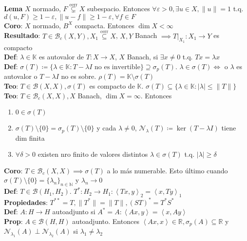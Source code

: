 \documentclass[9pt]{extarticle}
\newcommand{\N}{\mathbb{N}}
\newcommand{\R}{\mathbb{R}}
\newcommand{\K}{\mathbb{K}}
\newcommand{\inn}[1]{\left\langle #1\right\rangle}
\begin{document}
\begin{multicols*}{2}
\begin{enumerate}
\end{enumerate}
\textbf{Lema} $X$ normado, $F\overset{\text{cerr}}{\subsetneq} X$ subespacio. Entonces $\forall \varepsilon>0,\exists u\in X,\|u\|=1$ t.q. $d(u,F)\geq 1-\varepsilon, \|u-f\|\geq 1-\varepsilon,\forall f\in F$\\
\textbf{Coro}: $X$ normado, $B^X$ compacta. Entonces $\operatorname{dim}X<\infty$\\
\textbf{Resultado}: $T\in\mathcal{B}_c(X,Y), X_1\overset{\text{cerr}}{\subseteq}X$, $X,Y$ Banach $\implies T\big|_{X_1}:X_1\to Y$ es compacto\\
\textbf{Def}: $\lambda\in\K$ es autovalor de $T:X\to X$, $X$ Banach, si $\exists x\neq 0$ t.q. $Tx=\lambda x$\\
\textbf{Def}: $\sigma(T)\coloneqq \{\lambda\in\K:T-\lambda I\text{ no es invertible}\}\supseteq \sigma_p(T)$. $\lambda\in \sigma(T)\iff$ o $\lambda$ es autovalor o $T-\lambda I$ no es sobre. $\rho(T)=\K\setminus \sigma(T)$\\
\textbf{Teo}: $T\in\mathcal{B}(X,X), \sigma(T)$ es compacto de $\K$. $\sigma(T)\subseteq \{\lambda\in\K:|\lambda|\leq \|T\|\}$\\
\textbf{Teo}: $T\in\mathcal{B}_c(X,X), X$ Banach, $\operatorname{dim} X=\infty$. Entonces \begin{enumerate}
	\item $0\in\sigma(T)$
	\item $\sigma(T)\setminus\{0\}=\sigma_p(T)\setminus\{0\}$ y cada $\lambda\neq 0$, $\mathcal{N}_\lambda(T)\coloneqq \operatorname{ker}(T-\lambda I)$ tiene dim finita 
	\item $\forall \delta>0$ existen nro finito de valores distintos $\lambda\in\sigma(T)$ t.q. $|\lambda|\geq \delta$
\end{enumerate}
\textbf{Coro}: $T\in\mathcal{B}_c(X,X)\implies \sigma(T)$ a lo más numerable. Esto último cuando $\sigma(T)\setminus\{0\}=\{\lambda_n\}_{n\in\N}$ y $\lambda_n\to 0$\\
\textbf{Def}: $T\in\mathcal{B}(H_1,H_2)$. $T^*:H_2\to H_1:\inn{Tx,y}_2=\inn{x,Ty}_1$\\
\textbf{Propiedades}: $T^{**}=T, \|T^*\|=\|T\|, (ST)^*=T^*S^*$\\
\textbf{Def}: $A:H\to H$ autoadjunto si $A^*=A: \inn{Ax,y}=\inn{x,Ay}$\\
\textbf{Prop}: $A\in\mathcal{B}(H,H)$ autoadjunto. Entonces $\inn{Ax,x}\in\R, \sigma_p(A)\subseteq \R$ y $\mathcal{N}_{\lambda_1}(A)\perp\mathcal{N}_{\lambda_2}(A)$ si $\lambda_1\neq\lambda_2$\\

\end{multicols*}
\end{document}
